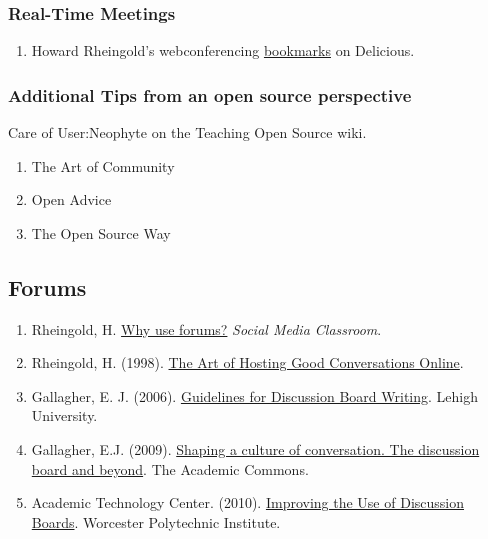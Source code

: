 \subsubsection{Real-Time Meetings}

\begin{enumerate}
\item Howard Rheingold's webconferencing \href{http://delicious.com/hrheingold/webconferencing}{bookmarks} on Delicious.
\end{enumerate}

\subsubsection{Additional Tips from an open source perspective}

Care of User:Neophyte on the Teaching Open Source wiki.

\begin{enumerate}
\item
  The Art of Community
\item
  Open Advice
\item
  The Open Source Way
\end{enumerate}
\subsection{Forums}

\begin{enumerate}
\item
  Rheingold, H. \href{http://blip.tv/file/1123048}{Why use forums?}
  \emph{Social Media Classroom}.
\item
  Rheingold, H. (1998).
  \href{http://www.rheingold.com/texts/artonlinehost.html}{The Art of
  Hosting Good Conversations Online}.
\item
  Gallagher, E. J. (2006).
  \href{http://www.lehigh.edu/~indiscus/doc\_guidelines.html}{Guidelines
  for Discussion Board Writing}. Lehigh University.
\item
  Gallagher, E.J.
  (2009). \href{http://www.academiccommons.org/2009/01/shaping-a-culture-of-conversation-the-discussion-board-and-beyond/}{Shaping
  a culture of conversation. The discussion board and beyond}. The
  Academic Commons.
\item
  Academic Technology Center. (2010).
  \href{http://www.wpi.edu/Academics/ATC/Collaboratory/Idea/boards.html}{Improving
  the Use of Discussion Boards}. Worcester Polytechnic Institute.
\end{enumerate}

